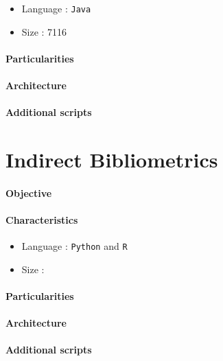 \begin{itemize}
\item Language : \texttt{Java}
\item Size : 7116
\end{itemize}


\paragraph{Particularities}

\paragraph{Architecture}

\paragraph{Additional scripts}



\newpage

\section{Indirect Bibliometrics}

\paragraph{Objective}

\paragraph{Characteristics}

\begin{itemize}
\item Language : \texttt{Python} and \texttt{R}
\item Size :
\end{itemize}


\paragraph{Particularities}

\paragraph{Architecture}

\paragraph{Additional scripts}






